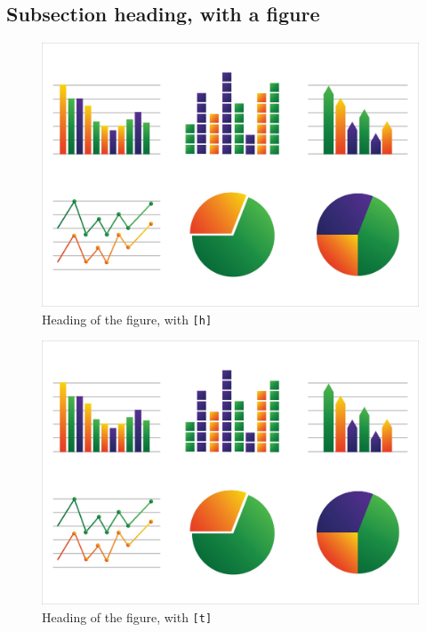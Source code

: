 \documentclass[12pt]{bppaper}
\begin{document}
\subsection{Subsection heading, with a figure}

\blindtext
\blindtext
\begin{figure}[h!]
\centering
\caption{Heading of the figure, with \texttt{[h]}}
\includegraphics[width=0.8\linewidth]{graph}
\end{figure}
\blindtext

\blindtext

\blindtext
\begin{figure}[t]
\centering
\caption{Heading of the figure, with \texttt{[t]}}
\includegraphics[width=0.8\linewidth]{graph}
\end{figure}
\blindtext
\end{document}
